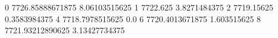 0 7726.85888671875 8.06103515625
1 7722.625 3.8271484375
2 7719.15625 0.3583984375
4 7718.7978515625 0.0
6 7720.4013671875 1.603515625
8 7721.93212890625 3.13427734375
